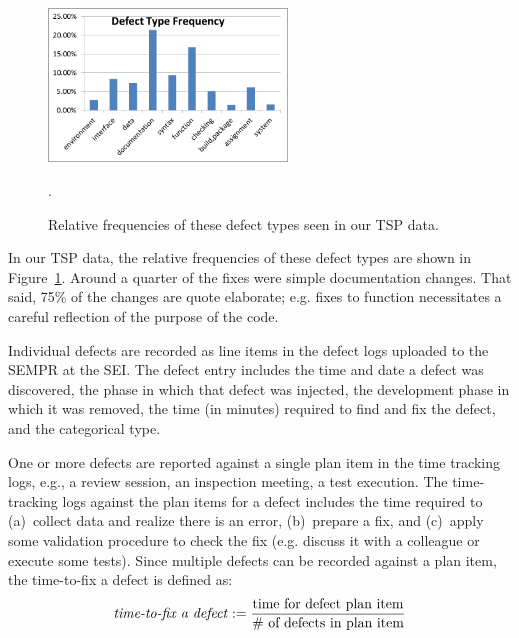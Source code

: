 \documentclass[smallcondensed]{svjour3}
\newcommand{\fig}[1]{Figure~\ref{fig:#1}}
\begin{document}
\begin{figure}[t]
\begin{center}
\includegraphics[width=2.5in]{defect_type_frequency.png}
\end{center}
\caption{Relative frequencies of these defect types seen in our TSP data.}\label{fig:dtypes}.
\end{figure}
In our TSP data,  the relative frequencies of these defect types are shown in \fig{dtypes}. Around a quarter of the fixes were simple documentation changes.
That said, 75\% of the changes are quote  elaborate;   e.g. fixes to function necessitates a careful reflection of the purpose of the code.

Individual defects are recorded as line items in the defect logs uploaded to the SEMPR at the SEI. The defect entry includes the time and date a defect was discovered, the phase in which that defect was injected, the development phase in which it was removed, the time (in minutes) required to find and fix the defect, and the categorical type. 

One or more defects are reported against a single plan item in the time tracking logs, e.g., a review session, an inspection meeting, a test execution. The time-tracking logs against the plan items for a defect includes the time required to (a)~collect data and realize there is an error, 
(b)~prepare a fix,  and (c)~apply some validation
procedure to check the fix (e.g. discuss it with a colleague or execute some tests).
Since multiple defects can be recorded against a plan item, the time-to-fix a defect is defined as:
\[
\text{\emph{time-to-fix a defect}} := \frac{\text{time for defect plan item}}{\text{\# of defects in plan item}}
\]
\end{document}
